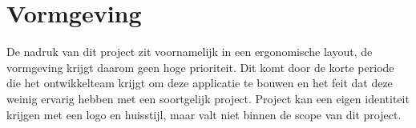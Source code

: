 \chapter{Vormgeving} \label{cha:vormgeving}

De nadruk van dit project zit voornamelijk in een ergonomische layout, de vormgeving krijgt daarom geen hoge prioriteit. Dit komt door de korte periode die het ontwikkelteam krijgt om deze applicatie te bouwen en het feit dat deze weinig ervarig hebben met een soortgelijk project. Project \projectname kan een eigen identiteit krijgen met een logo en huisstijl, maar valt niet binnen de scope van dit project. 
